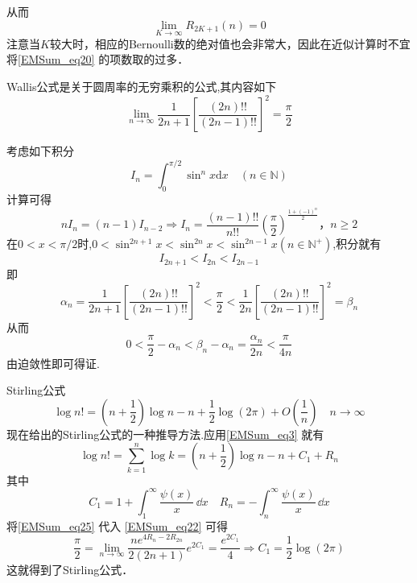 从而
\[
    \lim\limits_{K\to\infty}R_{2K+1}(n)=0	
\]
注意当$K$较大时，相应的Bernoulli数的绝对值也会非常大，因此在近似计算时不宜将\autoref{EMSum_eq20} 的项数取的过多．
\begin{lemma}{}
Wallis公式是关于圆周率的无穷乘积的公式,其内容如下
		\begin{equation}\label{EMSum_eq22}
			\lim_{n\to\infty}\frac{1}{2n+1}\left[\frac{(2n)!!}{(2n-1)!!}\right]^2=\frac{\pi}{2}
		\end{equation}
\end{lemma}
考虑如下积分
\begin{equation}
    I_{n}=\int_{0}^{\pi/2}\sin^{n}x\mathrm{d}x\quad(n\in{\mathbb{N}})
\end{equation}
计算可得
\[
    nI_{n}=(n-1)I_{n-2}\Rightarrow I_{n}=\frac{(n-1)!!}{n!!}
    \left(\frac{\pi}{2}\right)^{\frac{1+(-1)^n}{2}}，n\geqslant2
\]
在$0<x<\pi/2$时,$0<\sin^{2n+1}x<\sin^{2n}x<\sin^{2n-1}x(n\in{\mathbb{N}^{+}})$,积分就有
\[
    I_{2n+1}<I_{2n}<I_{2n-1}
\]
即
\[
    \alpha_{n}=\frac{1}{2n+1}\left[\frac{(2n)!!}{(2n-1)!!}\right]^2<\frac{\pi}{2}<\frac{1}{2n}\left[\frac{(2n)!!}{(2n-1)!!}\right]^2=\beta_{n}
\]
从而
\[
    0<\frac{\pi}{2}-\alpha_{n}<\beta_{n}-\alpha_{n}=\frac{\alpha_{n}}{2n}<\frac{\pi}{4n}
\]
由迫敛性即可得证.
\begin{example}{Stirling公式}
\begin{equation}
    \log n!=\left(n+\frac{1}{2}\right)\log n-n+\frac{1}{2}\log(2\pi)
    +O\left(\frac{1}{n}\right)\quad n\to\infty
\end{equation}
现在给出的Stirling公式的一种推导方法.应用\autoref{EMSum_eq3} 就有
\begin{equation}\label{EMSum_eq25}
    \log n!=\sum_{k=1}^{n}\log k=\left(n+\frac{1}{2}\right)\log n-n+C_{1}+R_{n}
\end{equation}
其中
\[
    C_{1}=1+\int_{1}^{\infty}\frac{\psi(x)}{x}\,\dd x\quad
    R_{n}=-\int_{n}^{\infty}\frac{\psi(x)}{x}\,\dd x
\]
将\autoref{EMSum_eq25} 代入 \autoref{EMSum_eq22} 可得
\[
    \frac{\pi}{2}=\lim_{n\to\infty}\frac{ne^{4R_n-2R_{2n}}}{2(2n+1)}e^{2C_{1}}
    =\frac{e^{2C_{1}}}{4}\Rightarrow C_{1}=\frac{1}{2}\log(2\pi)
\]
这就得到了Stirling公式．
\end{example}
